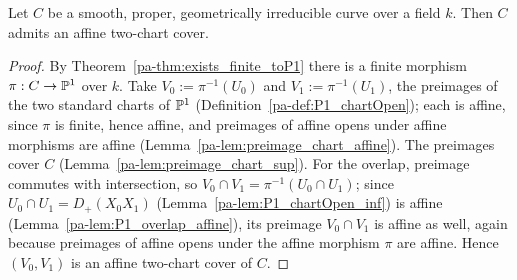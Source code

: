 \begin{theorem}
  \label{pa-thm:AffineTwoCover_nonempty_of_curve}
  \leanok

  Let \(C\) be a smooth, proper, geometrically irreducible curve over a field \(k\). Then \(C\)
  admits an affine two-chart cover.
\end{theorem}
\begin{proof}
  \leanok
  By Theorem~\ref{pa-thm:exists_finite_toP1} there is a finite morphism \(\pi : C \to \mathbb{P}^1\) over
  \(k\). Take \(V_0 := \pi^{-1}(U_0)\) and \(V_1 := \pi^{-1}(U_1)\), the preimages of the two
  standard charts of \(\mathbb{P}^1\) (Definition~\ref{pa-def:P1_chartOpen}); each is affine, since \(\pi\)
  is finite, hence affine, and preimages of affine opens under affine morphisms are affine
  (Lemma~\ref{pa-lem:preimage_chart_affine}). The preimages cover \(C\)
  (Lemma~\ref{pa-lem:preimage_chart_sup}). For the overlap, preimage commutes with intersection, so
  \(V_0 \cap V_1 = \pi^{-1}(U_0 \cap U_1)\); since \(U_0 \cap U_1 = D_+(X_0X_1)\)
  (Lemma~\ref{pa-lem:P1_chartOpen_inf}) is affine (Lemma~\ref{pa-lem:P1_overlap_affine}), its preimage
  \(V_0 \cap V_1\) is affine as well, again because preimages of affine opens under the affine
  morphism \(\pi\) are affine. Hence \((V_0, V_1)\) is an affine two-chart cover of \(C\).
\end{proof}

